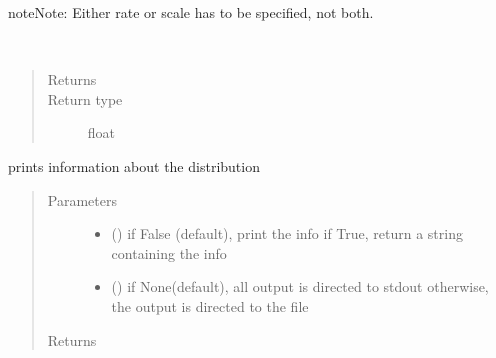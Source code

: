 \documentclass[letterpaper,10pt,english]{sphinxmanual}
\begin{document}
\begin{fulllineitems}
\begin{quote}
\begin{description}
\end{description}\end{quote}

\begin{sphinxadmonition}{note}{Note:}
Either rate or scale has to be specified, not both.
\end{sphinxadmonition}

\begin{fulllineitems}
\label{\detokenize{Reference:salabim.Erlang.mean}}~\begin{quote}\begin{description}
\item[{Returns}] \leavevmode
{}

\item[{Return type}] \leavevmode
float

\end{description}\end{quote}

\end{fulllineitems}


\begin{fulllineitems}
\label{\detokenize{Reference:salabim.Erlang.print_info}}
prints information about the distribution
\begin{quote}\begin{description}
\item[{Parameters}] \leavevmode\begin{itemize}
\item {} 
 () \textendash{} if False (default), print the info
if True, return a string containing the info

\item {} 
 () \textendash{} if None(default), all output is directed to stdout 
otherwise, the output is directed to the file

\end{itemize}

\item[{Returns}] \leavevmode
{}


\end{description}
\end{quote}
\end{fulllineitems}
\end{fulllineitems}
\end{document}
